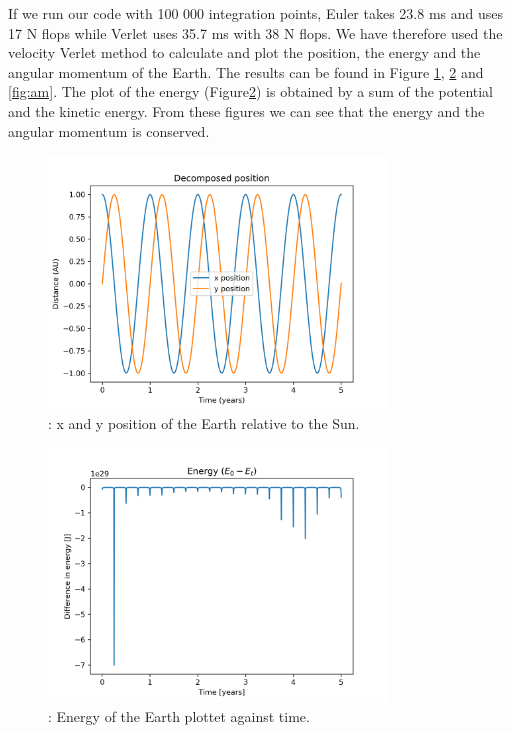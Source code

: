 \documentclass{article}
\begin{document}
    If we run our code with 100 000 integration points, Euler takes 23.8 ms and uses 17 N flops while Verlet uses 35.7 ms with 38 N flops. We have therefore used the velocity Verlet method to calculate and plot the position, the energy and the angular momentum of the Earth. The results can be found in Figure \ref{fig:position}, \ref{fig:energy} and \ref{fig:am}. The plot of the energy (Figure\ref{fig:energy}) is obtained by a sum of the potential and the kinetic energy. From these figures we can see that the energy and the angular momentum is conserved.

    \begin{figure}[H]
        \begin{center}
            \includegraphics[width=0.8\textwidth]{./Plot/xy_vs_time.png}
            \caption{: x and y position of the Earth relative to the Sun.}
            \label{fig:position}
        \end{center}
    \end{figure}

    \begin{figure}[H]
        \begin{center}
            \includegraphics[width=0.8\textwidth]{./Plot/energy.png}
            \caption{: Energy of the Earth plottet against time.
            }
            \label{fig:energy}
        \end{center}
    \end{figure}
\end{document}
